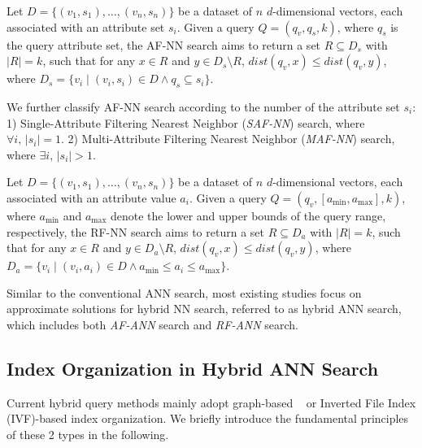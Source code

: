 \documentclass[sigconf, nonacm]{acmart}
\begin{document}
	\begin{definition}[AF-NN Search]
		Let \( D = \{(v_1, s_1), \ldots, (v_n, s_n)\} \) be a dataset of \( n \) \( d \)-dimensional vectors, each associated with an attribute set \( s_i \). Given a query \( Q = (q_v, q_s, k) \), where \( q_s \) is the query attribute set, the AF-NN search aims to return a set \( R \subseteq D_s \) with \( |R| = k \), such that for any \( x \in R \) and \( y \in D_s \setminus R \), \( \textit{dist}(q_v, x) \leq \textit{dist}(q_v, y) \), where \( D_s = \{ v_i \mid (v_i, s_i) \in D \land q_s \subseteq s_i \} \).
	\end{definition}
	
	We further classify AF-NN search according to the number of the attribute set \( s_i \): 1) Single-Attribute Filtering Nearest Neighbor (\textit{SAF-NN}) search, where $\forall i,\, |s_i| = 1$. 2) Multi-Attribute Filtering Nearest Neighbor (\textit{MAF-NN}) search, where $\exists i,\, |s_i| > 1$.
	
	\begin{definition}[RF-NN Search]
		
		Let \( D = \{(v_1, s_1), \ldots, (v_n, s_n)\} \) be a dataset of \( n \) \( d \)-dimensional vectors, each associated with an attribute value \( a_i \). Given a query \( Q = (q_v, [a_{\min}, a_{\max}], k) \), where \( a_{\min} \) and \( a_{\max} \) denote the lower and upper bounds of the query range, respectively, the RF-NN search aims to return a set \( R \subseteq D_a \) with \( |R| = k \), such that for any \( x \in R \) and \( y \in D_a \setminus R \), \( \textit{dist}(q_v, x) \leq \textit{dist}(q_v, y) \), where \( D_a = \{ v_i \mid (v_i, a_i) \in D \land a_{\min} \leq a_i \leq a_{\max} \} \).
	\end{definition}
	
	
	
	Similar to the conventional ANN search, most existing studies focus on approximate solutions for hybrid NN search, referred to as hybrid ANN search, which includes both \textit{AF-ANN} search and \textit{RF-ANN} search.
	
	
	
	\subsection{Index Organization in Hybrid ANN Search}
	
	Current hybrid query methods mainly adopt graph-based ~\cite{nsw,kgraph,nsg,fanng,ngt} or Inverted File Index (IVF)-based \cite{PQ} index organization. We briefly introduce the fundamental principles of these 2 types in the following.
	
\end{document}
